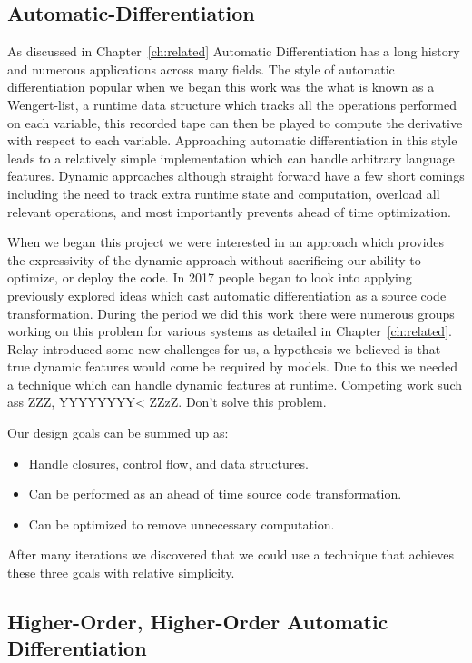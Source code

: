 \subsection{Automatic-Differentiation}

As discussed in Chapter~\ref{ch:related} Automatic Differentiation has a long history
  and numerous applications across many fields.
The style of automatic differentiation popular when we began this work was the
  what is known as a Wengert-list, a runtime data structure which tracks
  all the operations performed on each variable, this recorded tape can then
  be played to compute the derivative with respect to each variable.
Approaching automatic differentiation in this style leads to a relatively simple
  implementation which can handle arbitrary language features.
Dynamic approaches although straight forward have a few short comings
  including the need to track extra runtime state and computation,
  overload all relevant operations, and most importantly prevents
  ahead of time optimization.

When we began this project we were interested in an approach which
  provides the expressivity of the dynamic approach without
  sacrificing our ability to optimize, or deploy the code.
In 2017 people began to look into applying previously explored
  ideas which cast automatic differentiation as a source code
  transformation.
During the period we did this work there were numerous
  groups working on this problem for various systems
  as detailed in Chapter~\ref{ch:related}.
Relay introduced some new challenges for us, a hypothesis we
  believed is that true dynamic features would come be required
  by models.
Due to this we needed a technique which can handle dynamic
  features at runtime.
Competing work such ass ZZZ, YYYYYYYY< ZZzZ.
Don't solve this problem.

Our design goals can be summed up as:
\begin{itemize}
  \item Handle closures, control flow, and data structures.
  \item Can be performed as an ahead of time source code
    transformation.
  \item Can be optimized to remove unnecessary computation.
\end{itemize}

After many iterations we discovered that we could use a
  technique that achieves these three goals with relative
  simplicity.

\subsection{Higher-Order, Higher-Order Automatic Differentiation}
\label{sec:autodiff}

